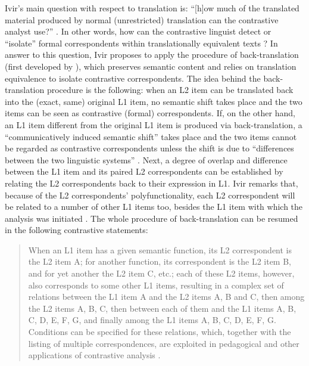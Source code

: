 Ivir’s main question with respect to translation is: “[h]ow much of the translated material produced by normal (unrestricted) translation can the contrastive analyst use?” \citep[16]{ivir_contrasting_1969}. In other words, how can the contrastive linguist detect or “isolate” formal correspondents within translationally equivalent texts \citep[175]{ivir_translation-based_1983}? In answer to this question, Ivir proposes to apply the procedure of back-translation (first developed by \citealt{spalatin_contrastive_1967}), which preserves semantic content \citep[477]{dirven_functionalism_1987} and relies on translation equivalence to isolate contrastive correspondents. The idea behind the back-translation procedure is the following: when an L2 item can be translated back into the (exact, same) original L1 item, no semantic shift takes place and the two items can be seen as contrastive (formal) correspondents. If, on the other hand, an L1 item different from the original L1 item is produced via back-translation, a “communicatively induced semantic shift” takes place and the two items cannot be regarded as contrastive correspondents \citep[477]{dirven_functionalism_1987} unless the shift is due to “differences between the two linguistic systems” \citep[176]{ivir_translation-based_1983}. Next, a degree of overlap and difference between the L1 item and its paired L2 correspondents can be established by relating the L2 correspondents back to their expression in L1. Ivir remarks that, because of the L2 correspondents’ polyfunctionality, each L2 correspondent will be related to a number of other L1 items too, besides the L1 item with which the analysis was initiated \citep[478]{dirven_functionalism_1987}. The whole procedure of back-translation can be resumed in the following contrastive statements:

\begin{quote}
When an L1 item has a given semantic function, its L2 correspondent is the L2 item A; for another function, its correspondent is the L2 item B, and for yet another the L2 item C, etc.; each of these L2 items, however, also corresponds to some other L1 items, resulting in a complex set of relations between the L1 item A and the L2 items A, B and C, then among the L2 items A, B, C, then between each of them and the L1 items A, B, C, D, E, F, G, and finally among the L1 items A, B, C, D, E, F, G. Conditions can be specified for these relations, which, together with the listing of multiple correspondences, are exploited in pedagogical and other applications of contrastive analysis \citep[478--479]{dirven_functionalism_1987}.
\end{quote}

